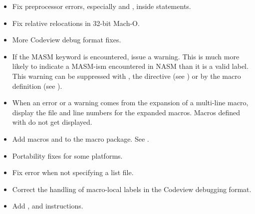 
\begin{itemize}
    \item{Fix preprocessor errors, especially  and
        , inside  statements.}

    \item{Fix relative relocations in 32-bit Mach-O.}

    \item{More Codeview debug format fixes.}

    \item{If the MASM  keyword is encountered, issue a warning. This is
        much more likely to indicate a MASM-ism encountered in NASM than it
        is a valid label. This warning can be suppressed with ,
        the \code{[warning]} directive (see ) or by the macro
        definition  (see ).}

    \item{When an error or a warning comes from the expansion of a multi-line
        macro, display the file and line numbers for the expanded macros.
        Macros defined with  do not get displayed.}

    \item{Add macros  and  to the  macro
        package. See .}
\end{itemize}


\begin{itemize}
    \item{Portability fixes for some platforms.}
    \item{Fix error when not specifying a list file.}
    \item{Correct the handling of macro-local labels in the Codeview debugging format.}
    \item{Add ,  and  instructions.}
\end{itemize}


